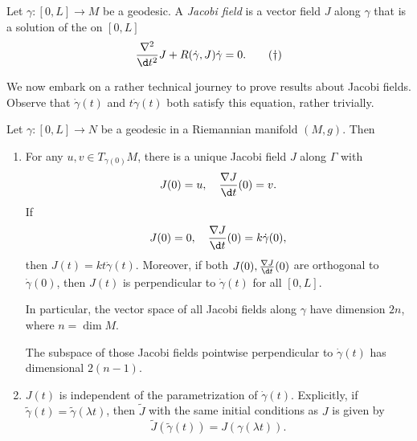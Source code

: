 \documentclass[a4paper]{article}
\begin{document}
\begin{defi}
  Let $\gamma: [0, L] \to M$ be a geodesic. A \emph{Jacobi field} is a vector field $J$ along $\gamma$ that is a solution of the  on $[0, L]$
  \[
    \frac{\nabla^2}{\d t^2} J + R(\dot{\gamma}, J) \dot{\gamma} = 0. \tag{$\dagger$}
  \]
\end{defi}

We now embark on a rather technical journey to prove results about Jacobi fields. Observe that $\dot{\gamma}(t)$ and $t \dot{\gamma}(t)$ both satisfy this equation, rather trivially.
\begin{thm}
  Let $\gamma: [0, L] \to N$ be a geodesic in a Riemannian manifold $(M, g)$. Then
  \begin{enumerate}
    \item For any $u, v \in T_{\gamma(0)}M$, there is a unique Jacobi field $J$ along $\Gamma$ with
      \[
        J(0) = u,\quad \frac{\nabla J}{\d t}(0) = v.
      \]
      If
      \[
        J(0) = 0,\quad \frac{\nabla J}{\d t}(0) = k \dot{\gamma}(0),
      \]
      then $J(t) = kt \dot{\gamma}(t)$. Moreover, if both $J(0), \frac{\nabla J}{\d t}(0)$ are orthogonal to $\dot{\gamma}(0)$, then $J(t)$ is perpendicular to $\dot{\gamma}(t)$ for all $[0, L]$.

      In particular, the vector space of all Jacobi fields along $\gamma$ have dimension $2n$, where $n = \dim M$.

      The subspace of those Jacobi fields pointwise perpendicular to $\dot{\gamma}(t)$ has dimensional $2(n - 1)$.
    \item $J(t)$ is independent of the parametrization of $\dot{\gamma}(t)$. Explicitly, if $\tilde{\gamma}(t) = \tilde{\gamma}(\lambda t)$, then $\tilde{J}$ with the same initial conditions as $J$ is given by
      \[
        \tilde{J}(\tilde{\gamma}(t)) = J(\gamma(\lambda t)).
      \]
  \end{enumerate}
\end{thm}
\end{document}
